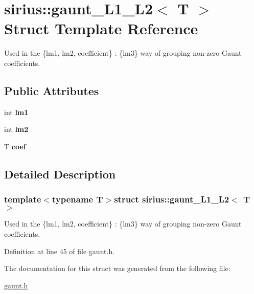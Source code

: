 \hypertarget{structsirius_1_1gaunt___l1___l2}{}\section{sirius\+:\+:gaunt\+\_\+\+L1\+\_\+\+L2$<$ T $>$ Struct Template Reference}
\label{structsirius_1_1gaunt___l1___l2}


Used in the \{lm1, lm2, coefficient\} \+: \{lm3\} way of grouping non-\/zero Gaunt coefficients.  


\subsection*{Public Attributes}
\begin{DoxyCompactItemize}
\item 
\hypertarget{structsirius_1_1gaunt___l1___l2_ad0dfc901b59bbbf49b45fa1224b00c5a}{}int {\bfseries lm1}\label{structsirius_1_1gaunt___l1___l2_ad0dfc901b59bbbf49b45fa1224b00c5a}

\item 
\hypertarget{structsirius_1_1gaunt___l1___l2_ae1180b471f2172a1ff7769d32916dc23}{}int {\bfseries lm2}\label{structsirius_1_1gaunt___l1___l2_ae1180b471f2172a1ff7769d32916dc23}

\item 
\hypertarget{structsirius_1_1gaunt___l1___l2_abc559e9ecbff4eb1dba9350367283857}{}T {\bfseries coef}\label{structsirius_1_1gaunt___l1___l2_abc559e9ecbff4eb1dba9350367283857}

\end{DoxyCompactItemize}


\subsection{Detailed Description}
\subsubsection*{template$<$typename T$>$struct sirius\+::gaunt\+\_\+\+L1\+\_\+\+L2$<$ T $>$}

Used in the \{lm1, lm2, coefficient\} \+: \{lm3\} way of grouping non-\/zero Gaunt coefficients. 

Definition at line 45 of file gaunt.\+h.



The documentation for this struct was generated from the following file\+:\begin{DoxyCompactItemize}
\item 
\hyperlink{gaunt_8h}{gaunt.\+h}\end{DoxyCompactItemize}
